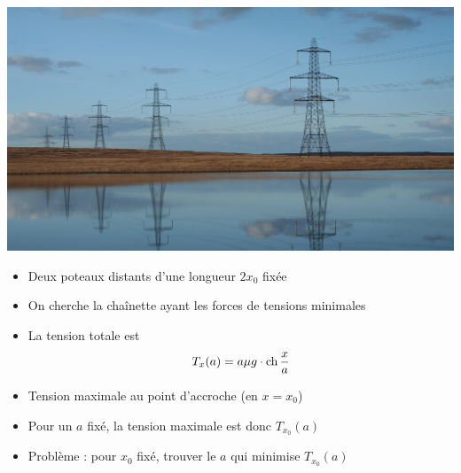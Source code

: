 \begin{frame}


\begin{minipage}{0.49\textwidth}
\begin{center}
   \includegraphics[width=\textwidth]{figures/Pylones_by_Graham_Sivills.jpg} 
 \end{center}  
\end{minipage}
\begin{minipage}{0.49\textwidth}
\shorthandoff{:}
\shorthandon{:}  
\end{minipage}

  \pause
 \begin{itemize}
   \item Deux poteaux distants d'une longueur $2x_0$ fixée
   \pause
   \item On cherche la chaînette ayant les forces de tensions minimales
   \pause
   \item La tension totale est 
   \vspace*{-2ex}
$$T_x(a) = a \mu g \cdot \mathop{\text{ch}}\nolimits \frac{x}{a}$$
 \vspace*{-4ex}
 \pause
  \item Tension maximale au point d'accroche (en $x=x_0$)
  \pause
  \item Pour un $a$ fixé, la tension maximale est donc $T_{x_0}(a)$
  \pause
  \item Problème : pour $x_0$ fixé, trouver le $a$ qui minimise $T_{x_0}(a)$
 \end{itemize}


\end{frame}


